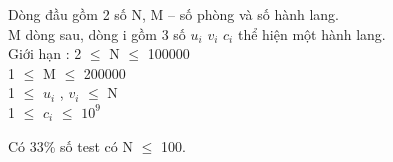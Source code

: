 Dòng đầu gồm 2 số N, M – số phòng và số hành lang.   
\\   M dòng sau, dòng i gồm 3 số $u_{i}$   $v_{i}$   $c_{i}$   thể hiện một hành lang.   
\\Giới hạn :   2  $\le$  N  $\le$  100000   
\\   1  $\le$  M  $\le$  200000   
\\   1  $\le$  $u_{i}$   , $v_{i}$    $\le$  N   
\\   1  $\le$  $c_{i}$    $\le$  $10^{9}$

   Có 33\% số test có N  $\le$  100.